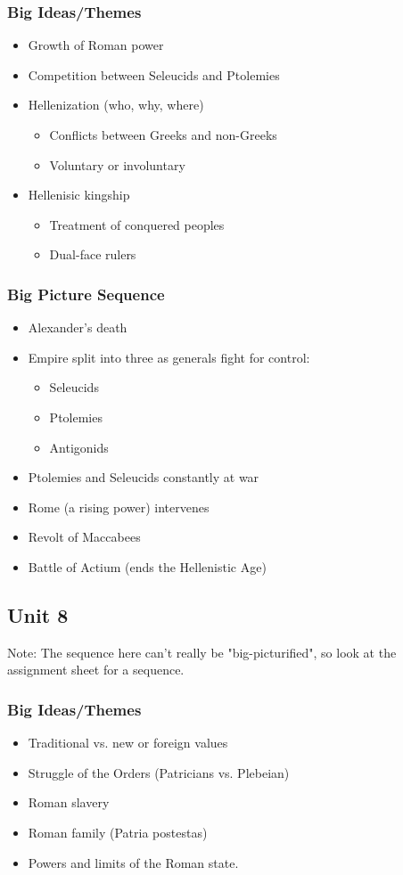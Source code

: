 \documentclass{article}
\begin{document}
\subsubsection*{Big Ideas/Themes}
\begin{itemize}
  \item Growth of Roman power
  \item Competition between Seleucids and Ptolemies
  \item Hellenization (who, why, where)
  \begin{itemize}
    \item Conflicts between Greeks and non-Greeks
    \item Voluntary or involuntary
  \end{itemize}
  \item Hellenisic kingship
  \begin{itemize}
    \item Treatment of conquered peoples
    \item Dual-face rulers
  \end{itemize}
\end{itemize}
\subsubsection*{Big Picture Sequence}
\begin{itemize}
  \item Alexander's death
  \item Empire split into three as generals fight for control:
  \begin{itemize}
    \item Seleucids
    \item Ptolemies
    \item Antigonids
  \end{itemize}
  \item Ptolemies and Seleucids constantly at war
  \item Rome (a rising power) intervenes
  \item Revolt of Maccabees
  \item Battle of Actium (ends the Hellenistic Age)
\end{itemize}
\subsection*{Unit 8}
Note: The sequence here can't really be "big-picturified", so look at the assignment sheet
for a sequence.
\subsubsection*{Big Ideas/Themes}
\begin{itemize}
  \item Traditional vs. new or foreign values
  \item Struggle of the Orders (Patricians vs. Plebeian)
  \item Roman slavery
  \item Roman family (Patria postestas)
  \item Powers and limits of the Roman state.
\end{itemize}
\end{document}
